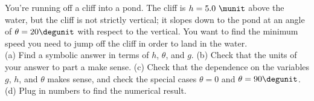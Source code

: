 You're running off a cliff into a pond. The cliff is $h=5.0\ \munit$ above the
water, but the cliff is not strictly vertical; it slopes down to the
pond at an angle of $\theta=20\degunit$ with respect to the vertical. 
You want to find
the minimum speed you need to jump off the cliff in order to land
in the water.\\
%
(a) Find a symbolic answer in terms of $h$, $\theta$, and $g$.\answercheck\hwendpart
%
(b) Check that the units of your answer to part a make sense.\hwendpart
%
(c) Check that the dependence on the variables $g$, $h$, and $\theta$ makes sense, and
check the special cases $\theta=0$ and $\theta=90\degunit$.\hwendpart
%
(d) Plug in numbers to find the numerical result.\answercheck\hwendpart

